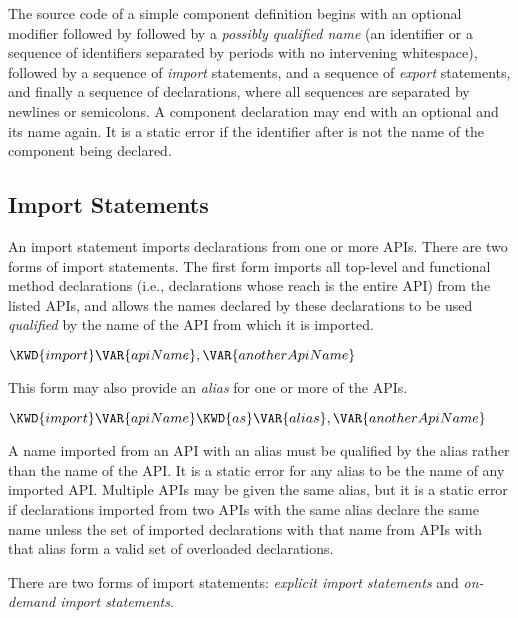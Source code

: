 The source code of a simple component definition
begins with an optional modifier  followed by
 followed by a
\emph{possibly qualified name} (an identifier or a sequence of
identifiers separated by periods with no intervening whitespace),
followed by a sequence of \emph{import} statements,
and a sequence of \emph{export} statements,
and finally a sequence of declarations,
where all sequences are separated by newlines or semicolons.
A component declaration may end with an optional  and its name again.
It is a static error if the identifier after  is not
the name of the component being declared.


\subsection{Import Statements}
An import statement imports declarations from one or more APIs.
There are two forms of import statements.
The first form imports all top-level and functional method declarations
(i.e., declarations whose reach is the entire API)
from the listed APIs,
and allows the names declared by these declarations
to be used \emph{qualified} by the name of the API
from which it is imported.
\begin{Fortress}
\(\KWD{import} \VAR{apiName}, \VAR{anotherApiName}\)
\end{Fortress}
This form may also provide an \emph{alias}
for one or more of the APIs.
\begin{Fortress}
\(\KWD{import} \VAR{apiName} \KWD{as} \VAR{alias}, \VAR{anotherApiName}\)
\end{Fortress}
A name imported from an API with an alias
must be qualified by the alias
rather than the name of the API.
It is a static error for any alias
to be the name of any imported API.
Multiple APIs may be given the same alias,
but it is a static error
if declarations imported from two APIs with the same alias
declare the same name
unless the set of imported declarations with that name
from APIs with that alias
form a valid set of overloaded declarations.

There are two forms of import statements: \emph{explicit import statements} and
\emph{on-demand import statements}.

